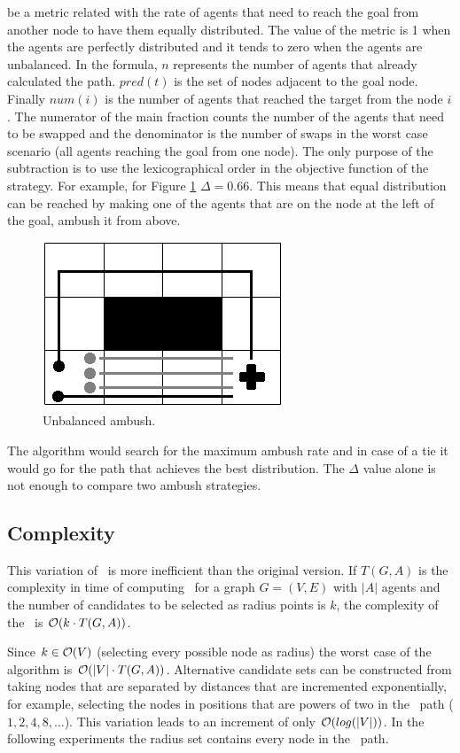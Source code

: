 \noindent
be a metric related with the rate of agents that need to
reach the goal from another node to have them equally
distributed. The value of the metric is 1 when the
agents are perfectly distributed and it tends to zero
when the agents are unbalanced.
In the formula, $n$ represents the number of agents that
already calculated the path.  $pred(t)$  is the set of nodes adjacent to
the goal node. Finally $num(i)$ is the number of agents that reached 
the target from the node $i$. 
The numerator of the main fraction counts the number of the agents
that need to be swapped and the denominator is the number of
swaps in the worst case scenario (all agents reaching the goal
from one node). The only purpose of the subtraction is to
use the lexicographical order in the objective function of
the strategy.
For example, for Figure \ref{unbalanced} $\Delta = 0.66$.
This means that equal distribution can be reached by making one of
the agents that are on the node at the left of the goal, ambush it
from above.

\begin{figure}[htb]
	\centerline{
		\includegraphics[width=0.48\columnwidth]{figures/unbalanced.png}
	}
	\caption{\label{unbalanced}
	     Unbalanced ambush.}
\end{figure}

The algorithm would search for the maximum ambush
rate and in case of a tie it would go for the path that
achieves the best distribution. The $\Delta$ value alone is
not enough to compare two ambush strategies.

\subsection{Complexity}

This variation of \ambush\ is more inefficient than the
original version. If $T(G,A)$ is the
complexity in time of computing \ambush\ for a graph
$G=(V,E)$ with $|A|$ agents and the number of candidates 
to be selected as radius points is $k$, the complexity
of the \sarambush\ is $\mathcal{O}(k\cdot T(G,A))$.

Since $k \in \mathcal{O}(V)$ (selecting every possible node
as radius) the worst case of the algorithm is
$\mathcal{O}(|V|\cdot T(G,A))$. Alternative candidate sets
can be constructed from taking nodes that are separated
by distances that are incremented exponentially, for
example, selecting the nodes in positions that are
powers of two in the \astar\ path ($1, 2, 4, 8, \ldots$).
This variation leads to an increment of only $\mathcal{O}(log(|V|))$.
In the following experiments the radius set contains
every node in the \astar\ path.
